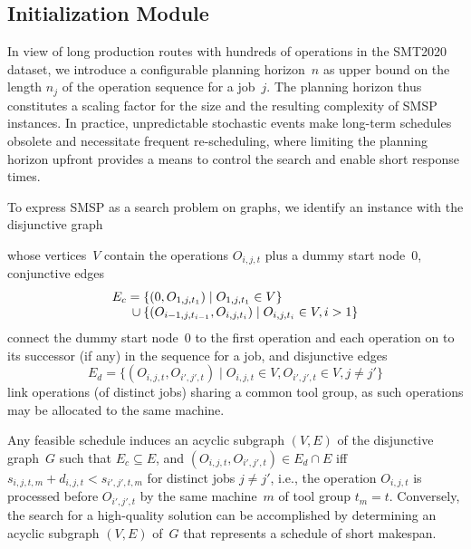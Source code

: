 \documentclass[runningheads]{llncs}
\begin{document}
\subsection{Initialization Module}
\label{subsec:initialization}
In view of long production routes with hundreds of operations
in the SMT2020 dataset, we introduce a configurable planning horizon~$n$
as upper bound on the length $n_j$ of the operation sequence for a job~$j$.
The planning horizon thus constitutes a scaling factor for the size and
the resulting complexity of SMSP instances.
In practice, unpredictable stochastic events make long-term schedules obsolete and necessitate frequent re-scheduling,
where limiting the planning horizon upfront provides a means to
control the search and enable short response times.

To express SMSP as a search problem on graphs,
we identify an instance with the disjunctive graph

whose vertices~$V$ contain the operations $O_{i,j,t}$ plus
a dummy start node~$0$,
conjunctive edges\linebreak[1]%
%
\begin{equation}
	\begin{array}{@{}r@{}l@{}}
		E_c = {}
		& \{(0,O_{1,j,t_1}) \mid O_{1,j,t_1}\in V\}
		\\ {} \cup {}
		& \{(O_{i-1,j,t_{i-1}},O_{i,j,t_i}) \mid O_{i,j,t_i}\in V, i > 1\}
	\end{array}
\end{equation}
%
connect the dummy start node~$0$ to the first operation
and each operation on to its successor (if any) in the sequence for a job,
and disjunctive edges\linebreak[1]%
%
\begin{equation}
	E_d = \{(O_{i,j,t},O_{i',j',t}) \mid O_{i,j,t}\in V,O_{i',j',t}\in V, j\neq j'\}
\end{equation}
%
link operations (of distinct jobs) sharing a common tool group,
as such operations may be allocated to the same machine.

Any feasible schedule induces an acyclic subgraph $(V,E)$ of 
the disjunctive graph~$G$
such that $E_c\subseteq E$, and $(O_{i,j,t},O_{i',j',t})\in E_d\cap E$
iff $s_{i,j,t,m}+d_{i,j,t} < s_{i',j',t,m}$ for distinct jobs $j\neq j'$,
i.e., the operation
$O_{i,j,t}$ is processed before $O_{i',j',t}$ by the same machine~$m$
of tool group $t_m=t$.
Conversely,
the search for a high-quality solution can be accomplished by
determining an acyclic subgraph $(V,E)$ of~$G$ that represents a schedule
of short makespan.
\end{document}
